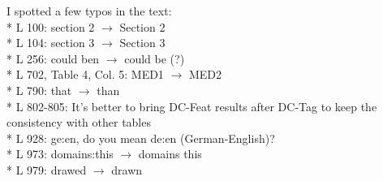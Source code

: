 \documentclass[12pt,times,a4paper,twoside]{article}
\theoremstyle{definition}
\begin{document}
I spotted a few typos in the text:
\\
* L 100: section 2 $\rightarrow$ Section 2
\\
* L 104: section 3 $\rightarrow$ Section 3
\\
* L 256: could ben $\rightarrow$ could be (?)
\\
* L 702, Table 4, Col. 5: MED1 $\rightarrow$ MED2
\\
* L 790: that $\rightarrow$ than
\\
* L 802-805: It’s better to bring DC-Feat results after DC-Tag to keep the consistency with other tables 
\\
* L 928: ge:en, do you mean de:en (German-English)? 
\\
* L 973: domains:this $\rightarrow$ domains this
\\
* L 979: drawed $\rightarrow$ drawn 
\end{document}
